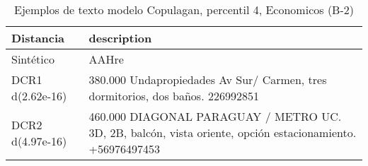 \begin{table}[H]
\centering
\fontsize{10}{14}\selectfont
\caption{Ejemplos de texto modelo Copulagan, percentil 4, Economicos (B-2)}
\label{table-example-economicos-b-2-copulagan-4p-text}
\begin{tabular}{|l|m{35em}|}
\hline
\rowcolor[gray]{0.8}
Distancia & description \\
\hline Sintético & AAHre \\
\hline DCR1 d(2.62e-16) & 380.000  Undapropiedades Av Sur/ Carmen,  tres dormitorios,  dos ba\~nos.   226992851 \\
\hline DCR2 d(4.97e-16) & 460.000 DIAGONAL PARAGUAY / METRO UC. 3D, 2B, balc\'on, vista oriente, opci\'on estacionamiento. +56976497453 \\
\hline
\end{tabular}
\end{table}

